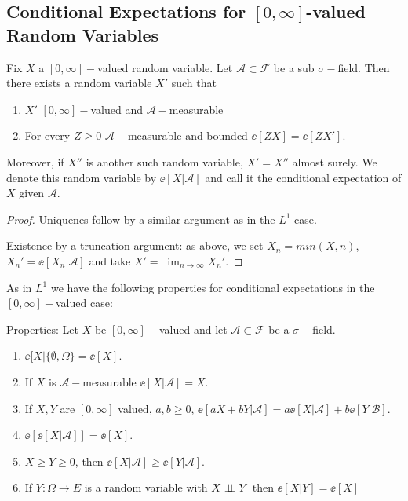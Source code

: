 \documentclass[../main.tex]{subfiles}
\begin{document}
    \subsection{Conditional Expectations for $[0, \infty]$-valued Random Variables}

    \begin{theorem}
      Fix $X$ a $[0, \infty]-$valued random variable. 
      Let $\mathcal{A} \subset \mathcal{F}$ be a sub $\sigma-$field. Then
      there exists a random variable $X'$ such that
      \begin{enumerate}
        \item $X'$ $[0, \infty]-$valued and $\mathcal{A}-$measurable
        \item For every $Z \geq 0$ $\mathcal{A}-$measurable and bounded $\ee[ZX] =
          \ee[ZX']$.
      \end{enumerate}
      Moreover, if $X''$ is another such random variable, $X' = X''$ almost
      surely. We denote this random variable by $\ee[X | \mathcal{A}]$ and
      call it the conditional expectation of $X$ given $\mathcal{A}$.
    \end{theorem}
    \begin{proof}
        Uniquenes follow by a similar argument as in the $L^1$ case.

        Existence by a truncation argument: as above, we set $X_n  = min(X,
        n)$, $X_n' = \ee[X_n | \mathcal{A}]$ and take $X' = \lim_{n \to
        \infty}X_n'$.
    \end{proof}

    As in $L^1$ we have the following properties for conditional expectations
    in the $[0, \infty]-$valued case:

    \vspace{1em}\noindent

    \underline{Properties:} Let $X$ be $[0, \infty]-$valued and let
    $\mathcal{A} \subset \mathcal{F}$ be a $\sigma-$field.
    \begin{enumerate}
      \item $\ee[X | \{ \emptyset, \Omega \} = \ee[X]$.
      \item If $X$ is $\mathcal{A}-$measurable $\ee[X | \mathcal{A}] = X$.
      \item If $X, Y$ are $[0, \infty]$ valued, $a, b \geq 0$, $\ee[aX + bY |
        \mathcal{A}] = a\ee[X | \mathcal{A}] + b \ee[Y | \mathcal{B}]$.
      \item $\ee[\ee[X | \mathcal{A}]] = \ee[X]$.
      \item $X \geq Y \geq 0$, then $\ee[X | \mathcal{A}] \geq \ee[Y |
        \mathcal{A}]$.
      \item If $Y \colon \Omega \to E$ is a random variable with $X \perp\!\!\!\!\,\perp Y$
        then $\ee[X | Y] = \ee[X]$
    \end{enumerate}
\end{document}
